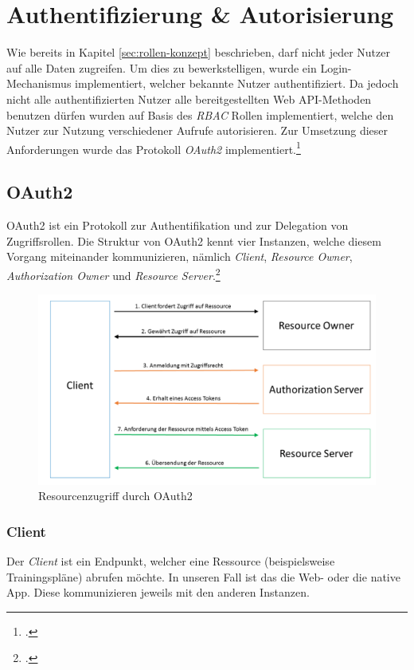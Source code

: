 \section{Authentifizierung \& Autorisierung}
\label{sec:server-authorisierung}
Wie bereits in Kapitel \ref{sec:rollen-konzept} beschrieben, darf nicht jeder Nutzer auf alle Daten zugreifen. Um dies zu bewerkstelligen, wurde ein Login-Mechanismus implementiert, welcher bekannte Nutzer authentifiziert. Da jedoch nicht alle authentifizierten Nutzer alle bereitgestellten Web \ac{API}-Methoden benutzen dürfen wurden auf Basis des \textit{\ac{RBAC}} Rollen implementiert, welche den Nutzer zur Nutzung verschiedener Aufrufe autorisieren. Zur Umsetzung dieser Anforderungen wurde das Protokoll \textit{OAuth2} implementiert.\footcite{online:WebApi_Authorize}
\subsection{OAuth2}
\label{ssec:oauth2}
OAuth2 ist ein Protokoll zur Authentifikation und zur Delegation von Zugriffsrollen. Die Struktur von OAuth2 kennt vier Instanzen, welche diesem Vorgang miteinander kommunizieren, nämlich \textit{Client}, \textit{Resource Owner}, \textit{Authorization Owner} und \textit{Resource Server}.\footcite[S. 286]{book:AngularJs:Steyer2015} 
\begin{figure}[h]
\centering
\includegraphics[width=1\linewidth]{content/images/OAuth2}
\caption{Resourcenzugriff durch OAuth2}
\label{pic:OAuth2}
\end{figure}
\subsubsection*{Client}
Der \textit{Client} ist ein Endpunkt, welcher eine Ressource (beispielsweise Trainingspläne) abrufen möchte. In unseren Fall ist das die Web- oder die native App. Diese kommunizieren jeweils mit den anderen Instanzen.
